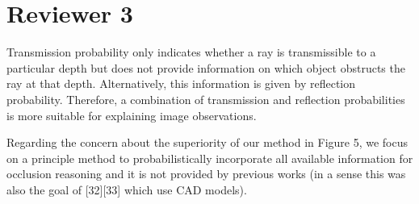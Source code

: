 \documentclass[10pt,twocolumn,letterpaper]{article}
\begin{document}
\section{Reviewer 3}

Transmission probability only indicates whether a ray is transmissible to a particular depth but does not provide information on which object obstructs the ray at that depth. Alternatively, this information is given by reflection probability. Therefore, a combination of transmission and reflection probabilities is more suitable for explaining image observations.

Regarding the concern about the superiority of our method in Figure 5, we focus on a principle method to probabilistically incorporate all available information for occlusion reasoning and it is not provided by previous works (in a sense this was also the goal of [32][33] which use CAD models).
\end{document}
